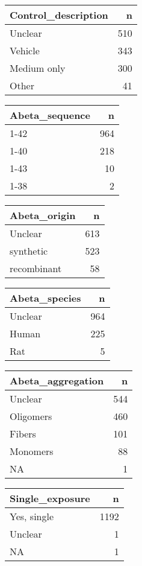 \documentclass[
]{article}
\begin{document}
\begin{longtable}[]{@{}lr@{}}
\toprule()
Control\_description & n \\
\midrule()
\endhead
Unclear & 510 \\
Vehicle & 343 \\
Medium only & 300 \\
Other & 41 \\
\bottomrule()
\end{longtable}

\begin{longtable}[]{@{}lr@{}}
\toprule()
Abeta\_sequence & n \\
\midrule()
\endhead
1-42 & 964 \\
1-40 & 218 \\
1-43 & 10 \\
1-38 & 2 \\
\bottomrule()
\end{longtable}

\begin{longtable}[]{@{}lr@{}}
\toprule()
Abeta\_origin & n \\
\midrule()
\endhead
Unclear & 613 \\
synthetic & 523 \\
recombinant & 58 \\
\bottomrule()
\end{longtable}

\begin{longtable}[]{@{}lr@{}}
\toprule()
Abeta\_species & n \\
\midrule()
\endhead
Unclear & 964 \\
Human & 225 \\
Rat & 5 \\
\bottomrule()
\end{longtable}

\begin{longtable}[]{@{}lr@{}}
\toprule()
Abeta\_aggregation & n \\
\midrule()
\endhead
Unclear & 544 \\
Oligomers & 460 \\
Fibers & 101 \\
Monomers & 88 \\
NA & 1 \\
\bottomrule()
\end{longtable}

\begin{longtable}[]{@{}lr@{}}
\toprule()
Single\_exposure & n \\
\midrule()
\endhead
Yes, single & 1192 \\
Unclear & 1 \\
NA & 1 \\
\bottomrule()
\end{longtable}
\end{document}
